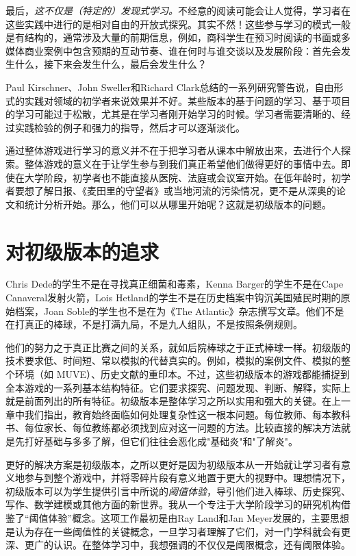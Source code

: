 最后，\textit{这不仅是（特定的）发现式学习。}不经意的阅读可能会让人觉得，学习者在这些实践中进行的是相对自由的开放式探究。其实不然！这些参与学习的模式一般是有结构的，通常涉及大量的前期信息，例如，商科学生在预习时阅读的书面或多媒体商业案例中包含预期的互动节奏、谁在何时与谁交谈以及发展阶段：首先会发生什么，接下来会发生什么，最后会发生什么？

Paul Kirschner、John Sweller和Richard Clark总结的一系列研究警告说，自由形式的实践对领域的初学者来说效果并不好。某些版本的基于问题的学习、基于项目的学习可能过于松散，尤其是在学习者刚开始学习的时候。学习者需要清晰的、经过实践检验的例子和强力的指导，然后才可以逐渐淡化。

通过整体游戏进行学习的意义并不在于把学习者从课本中解放出来，去进行个人探索。整体游戏的意义在于让学生参与到我们真正希望他们做得更好的事情中去。即使在大学阶段，初学者也不能直接从医院、法庭或会议室开始。在低年龄时，初学者要想了解日报、《麦田里的守望者》或当地河流的污染情况，更不是从深奥的论文和统计分析开始。那么，他们可以从哪里开始呢？这就是初级版本的问题。

\section*{对初级版本的追求}

Chris Dede的学生不是在寻找真正细菌和毒素，Kenna Barger的学生不是在Cape Canaveral发射火箭，Lois Hetland的学生不是在历史档案中钩沉美国殖民时期的原始档案，Joan Soble的学生也不是在为《The Atlantic》杂志撰写文章。他们不是在打真正的棒球，不是打满九局，不是九人组队，不是按照条例规则。

他们的努力之于真正比赛之间的关系，就如后院棒球之于正式棒球一样。初级版的技术要求低、时间短、常以模拟的代替真实的。例如，模拟的案例文件、模拟的整个环境（如 MUVE）、历史文献的重印本。不过，这些初级版本的游戏都能捕捉到全本游戏的一系列基本结构特征。它们要求探究、问题发现、判断、解释，实际上就是前面列出的所有特征。初级版本是整体学习之所以实用和强大的关键。在上一章中我们指出，教育始终面临如何处理复杂性这一根本问题。每位教师、每本教科书、每位家长、每位教练都必须找到应对这一问题的方法。比较直接的解决方法就是先打好基础与多多了解，但它们往往会恶化成"基础炎"和"了解炎"。

更好的解决方案是初级版本，之所以更好是因为初级版本从一开始就让学习者有意义地参与到整个游戏中，并将零碎片段有意义地置于更大的视野中。理想情况下，初级版本可以为学生提供引言中所说的\textit{阈值体验}，导引他们进入棒球、历史探究、写作、数学建模或其他方面的新世界。我从一个专注于大学阶段学习的研究机构借鉴了“阈值体验”概念。这项工作最初是由Ray Land和Jan Meyer发展的，主要思想是认为存在一些阈值性的关键概念，一旦学习者理解了它们，对一门学科就会有更深、更广的认识。在整体学习中，我想强调的不仅仅是阈限概念，还有阈限体验。

